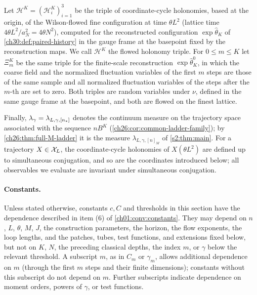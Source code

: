Let $\mathcal H^K=(\mathcal H^K_i)_{i=1}^3$ be the triple of coordinate-cycle holonomies, based at the origin, of the Wilson-flowed fine configuration at time $\theta L^2$ (lattice time $4\theta L^2/a_N^2=4\theta N^2$), computed for the reconstructed configuration $\exp\widehat\theta_K$ of \cref{ch30:def:paired-history} in the gauge frame at the basepoint fixed by the reconstruction maps. We call $\mathcal H^K$ the flowed holonomy triple. For $0\le m\le K$ let $\Xi_m^K$ be the same triple for the finite-scale reconstruction $\exp\widehat\theta_K^0$, in which the coarse field and the normalized fluctuation variables of the first $m$ steps are those of the same sample and all normalized fluctuation variables of the steps after the $m$-th are set to zero. Both triples are random variables under $\nu$, defined in the same gauge frame at the basepoint, and both are flowed on the finest lattice.

Finally, $\lambda_\gamma=\lambda_{L,\gamma,[n_*]}$ denotes the continuum measure on the trajectory space associated with the sequence $nB^K$ (\cref{ch26:cor:common-ladder-family}); by \cref{ch26:thm:full-M-ladder} it is the measure $\lambda_{L,\gamma,[n]_M}$ of \cref{s2:thm:main}. For a trajectory $X\in\mathcal X_L$, the coordinate-cycle holonomies of $X(\theta L^2)$ are defined up to simultaneous conjugation, and so are the coordinates introduced below; all observables we evaluate are invariant under simultaneous conjugation.

\paragraph{Constants.}
Unless stated otherwise, constants $c,C$ and thresholds in this section have the dependence described in item (6) of \cref{ch01:conv:constants}. They may depend on $n$, $L$, $\theta$, $M$, $J$, the construction parameters, the horizon, the flow exponents, the loop lengths, and the patches, tubes, test functions, and extensions fixed below, but not on $K$, $N$, the preceding classical depths, the index $m$, or $\gamma$ below the relevant threshold. A subscript $m$, as in $C_m$ or $\gamma_m$, allows additional dependence on $m$ (through the first $m$ steps and their finite dimensions); constants without this subscript do not depend on $m$. Further subscripts indicate dependence on moment orders, powers of $\gamma$, or test functions.

